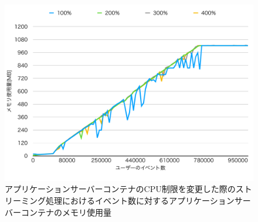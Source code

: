 \documentclass[../../../../../main]{subfiles}
\begin{document}
    \begin{figure}[H]
        \centering
        \includegraphics[width=12cm]{graph}
        \caption{アプリケーションサーバーコンテナのCPU制限を変更した際のストリーミング処理におけるイベント数に対するアプリケーションサーバーコンテナのメモリ使用量}
        \label{fig:stream-change-app-cpu-limit-app-memory-app_1024-db_1_1024}
    \end{figure}
\end{document}
